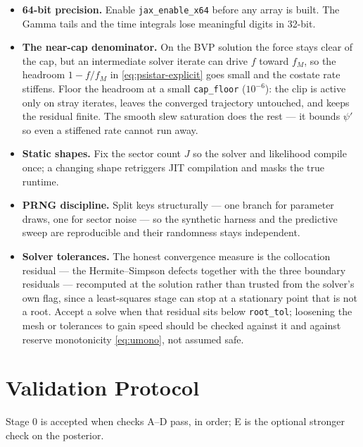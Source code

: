 \documentclass[11pt]{article}
\begin{document}
\begin{itemize}
\item \textbf{64-bit precision.} Enable \texttt{jax\_enable\_x64} before any array is built. The Gamma tails and the time integrals lose meaningful digits in 32-bit.

\item \textbf{The near-cap denominator.} On the BVP solution the force stays clear of the cap, but an intermediate solver iterate can drive $f$ toward $f_M$, so the headroom $1 - f/f_M$ in \eqref{eq:psistar-explicit} goes small and the costate rate stiffens. Floor the headroom at a small \texttt{cap\_floor} ($10^{-6}$): the clip is active only on stray iterates, leaves the converged trajectory untouched, and keeps the residual finite. The smooth slew saturation does the rest --- it bounds $\psi'$ so even a stiffened rate cannot run away.

\item \textbf{Static shapes.} Fix the sector count $J$ so the solver and likelihood compile once; a changing shape retriggers JIT compilation and masks the true runtime.

\item \textbf{PRNG discipline.} Split keys structurally --- one branch for parameter draws, one for sector noise --- so the synthetic harness and the predictive sweep are reproducible and their randomness stays independent.

\item \textbf{Solver tolerances.} The honest convergence measure is the collocation residual --- the Hermite--Simpson defects together with the three boundary residuals --- recomputed at the solution rather than trusted from the solver's own flag, since a least-squares stage can stop at a stationary point that is not a root. Accept a solve when that residual sits below \texttt{root\_tol}; loosening the mesh or tolerances to gain speed should be checked against it and against reserve monotonicity \eqref{eq:umono}, not assumed safe.
\end{itemize}

\section{Validation Protocol}\label{sec:validation}

Stage 0 is accepted when checks A--D pass, in order; E is the optional stronger check on the posterior.
\end{document}
